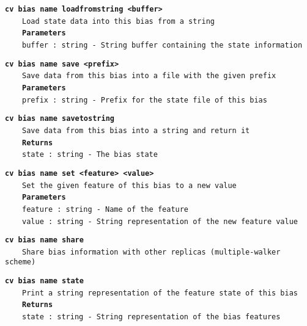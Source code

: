 \begin{mdexampleinput}{}
\texttt{\textbf{cv bias name loadfromstring <buffer>}}
\\
\-~~~~\texttt{Load state data into this bias from a string}
\\
\-~~~~\texttt{\textbf{Parameters}}
\\
\-~~~~\texttt{buffer : string - String buffer containing the state information}
\end{mdexampleinput}
\begin{mdexampleinput}{}
\texttt{\textbf{cv bias name save <prefix>}}
\\
\-~~~~\texttt{Save data from this bias into a file with the given prefix}
\\
\-~~~~\texttt{\textbf{Parameters}}
\\
\-~~~~\texttt{prefix : string - Prefix for the state file of this bias}
\end{mdexampleinput}
\begin{mdexampleinput}{}
\texttt{\textbf{cv bias name savetostring}}
\\
\-~~~~\texttt{Save data from this bias into a string and return it}
\\
\-~~~~\texttt{\textbf{Returns}}
\\
\-~~~~\texttt{state : string - The bias state}
\end{mdexampleinput}
\begin{mdexampleinput}{}
\texttt{\textbf{cv bias name set <feature> <value>}}
\\
\-~~~~\texttt{Set the given feature of this bias to a new value}
\\
\-~~~~\texttt{\textbf{Parameters}}
\\
\-~~~~\texttt{feature : string - Name of the feature}
\\
\-~~~~\texttt{value : string - String representation of the new feature value}
\end{mdexampleinput}
\begin{mdexampleinput}{}
\texttt{\textbf{cv bias name share}}
\\
\-~~~~\texttt{Share bias information with other replicas (multiple-walker scheme)}
\end{mdexampleinput}
\begin{mdexampleinput}{}
\texttt{\textbf{cv bias name state}}
\\
\-~~~~\texttt{Print a string representation of the feature state of this bias}
\\
\-~~~~\texttt{\textbf{Returns}}
\\
\-~~~~\texttt{state : string - String representation of the bias features}
\end{mdexampleinput}
